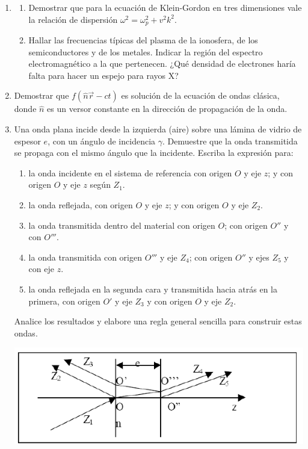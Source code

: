 \documentclass[11pt,spanish,a4paper]{article}
\begin{document}
\begin{enumerate}
\item
\begin{enumerate}
	\item Demostrar que para la ecuación de Klein-Gordon en tres dimensiones vale la relación de dispersión \(\omega^2= \omega_p^2 + v^2 k^2\).
	\item Hallar las frecuencias típicas del plasma de la ionosfera, de los semiconductores y de los metales.
		Indicar la región del espectro electromagnético a la que pertenecen.
		¿Qué densidad de electrones haría falta para hacer un espejo para rayos X?
\end{enumerate}


\item Demostrar que \(f(\hat{n} \vec{r} - ct)\) es solución de la ecuación de ondas clásica, donde \(\hat{n}\) es un versor constante en la dirección de propagación de la onda.


\item Una onda plana incide desde la izquierda (aire) sobre una lámina de vidrio de espesor \(e\), con un ángulo de incidencia \(\gamma\).
	Demuestre que la onda transmitida se propaga con el	mismo ángulo que la incidente.
	Escriba la expresión para:
	\begin{enumerate}
		\item la onda incidente en el sistema de referencia con origen \(O\) y eje \(z\); y con origen \(O\) y eje \(z\) según \(Z_1\).
		\item la onda reflejada, con origen \(O\) y eje \(z\); y con origen \(O\) y eje \(Z_2\).
		\item la onda transmitida dentro del material con origen \(O\); con origen \(O''\) y con \(O'''\).
		\item la onda transmitida con origen \(O'''\) y eje \(Z_4\); con origen \(O''\) y ejes \(Z_5\) y con eje \(z\).
		\item la onda reflejada en la segunda cara y transmitida hacia atrás en la primera, con origen \(O'\) y eje \(Z_3\) y con origen \(O\) y eje \(Z_2\).
	\end{enumerate}
	Analice los resultados y elabore una regla general sencilla para construir estas ondas.
    \begin{center}
		\includegraphics[width=0.65\linewidth]{g07e03}
	\end{center}



\end{enumerate}
\end{document}
